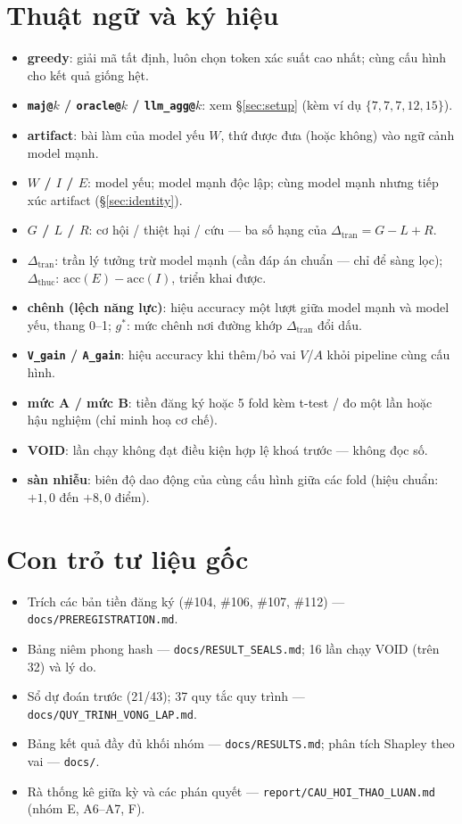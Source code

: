 \documentclass[12pt,a4paper]{article}
\newcommand{\dceil}{\Delta_{\mathrm{tran}}}
\newcommand{\dhonest}{\Delta_{\mathrm{thuc}}}
\newcommand{\acc}{\mathrm{acc}}
\begin{document}
\appendix
\section{Thuật ngữ và ký hiệu}\label{app:glossary}
\begin{itemize}\itemsep1pt
\item[] \textbf{greedy}: giải mã tất định, luôn chọn token xác suất cao nhất; cùng cấu hình cho
kết quả giống hệt.
\item[] \textbf{\texttt{maj@}$k$ / \texttt{oracle@}$k$ / \texttt{llm\_agg@}$k$}: xem
\S\ref{sec:setup} (kèm ví dụ $\{7,7,7,12,15\}$).
\item[] \textbf{artifact}: bài làm của model yếu $W$, thứ được đưa (hoặc không) vào ngữ cảnh
model mạnh.
\item[] \textbf{$W$ / $I$ / $E$}: model yếu; model mạnh độc lập; cùng model mạnh nhưng tiếp xúc
artifact (\S\ref{sec:identity}).
\item[] \textbf{$G$ / $L$ / $R$}: cơ hội / thiệt hại / cứu --- ba số hạng của
$\dceil = G - L + R$.
\item[] \textbf{$\dceil$}: trần lý tưởng trừ model mạnh (cần đáp án chuẩn --- chỉ để sàng lọc);
\textbf{$\dhonest$}: $\acc(E)-\acc(I)$, triển khai được.
\item[] \textbf{chênh (lệch năng lực)}: hiệu accuracy một lượt giữa model mạnh và model yếu,
thang 0--1; \textbf{$g^\ast$}: mức chênh nơi đường khớp $\dceil$ đổi dấu.
\item[] \textbf{\texttt{V\_gain} / \texttt{A\_gain}}: hiệu accuracy khi thêm/bỏ vai $V$/$A$
khỏi pipeline cùng cấu hình.
\item[] \textbf{mức A / mức B}: tiền đăng ký hoặc 5 fold kèm t-test / đo một lần hoặc hậu
nghiệm (chỉ minh hoạ cơ chế).
\item[] \textbf{VOID}: lần chạy không đạt điều kiện hợp lệ khoá trước --- không đọc số.
\item[] \textbf{sàn nhiễu}: biên độ dao động của cùng cấu hình giữa các fold (hiệu chuẩn:
$+1{,}0$ đến $+8{,}0$ điểm).
\end{itemize}

\section{Con trỏ tư liệu gốc}
\begin{itemize}\itemsep1pt
\item[\textbf{B.}] Trích các bản tiền đăng ký (\#104, \#106, \#107, \#112) --- \texttt{docs/PREREGISTRATION.md}.
\item[\textbf{C.}] Bảng niêm phong hash --- \texttt{docs/RESULT\_SEALS.md}; 16 lần chạy VOID (trên 32) và lý do.
\item[\textbf{D.}] Sổ dự đoán trước (21/43); 37 quy tắc quy trình --- \texttt{docs/QUY\_TRINH\_VONG\_LAP.md}.
\item[\textbf{E.}] Bảng kết quả đầy đủ khối nhóm --- \texttt{docs/RESULTS.md}; phân tích Shapley theo vai --- \texttt{docs/}.
\item[\textbf{F.}] Rà thống kê giữa kỳ và các phán quyết --- \texttt{report/CAU\_HOI\_THAO\_LUAN.md} (nhóm E, A6--A7, F).
\end{itemize}
\end{document}
